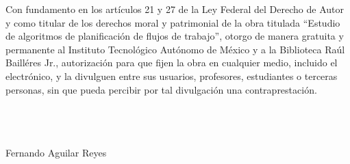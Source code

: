 \thispagestyle{empty}
\noindent Con fundamento en los artículos 21 y 27 de la Ley Federal del Derecho de Autor y como titular de los derechos moral y patrimonial de la obra titulada ``Estudio de algoritmos de planificación de flujos de trabajo'', otorgo de manera gratuita y permanente al Instituto Tecnológico Autónomo de México y a la Biblioteca Raúl Bailléres Jr., autorización para que fijen la obra en cualquier medio, incluido el electrónico, y la divulguen entre sus usuarios, profesores, estudiantes o terceras personas, sin que pueda percibir por tal divulgación una contraprestación.\\\\\\\\

\begin{center} 
Fernando Aguilar Reyes\\
\par\noindent\makebox[2.5in]{ }\\
\par\noindent\makebox[2.5in]{\hrulefill}\\
\par\noindent{}\\
\par\noindent\makebox[2.5in]{ }\\
\par\noindent\makebox[2.5in]{\hrulefill}\\
\par\noindent{}\\
\end{center}
\clearpage %

